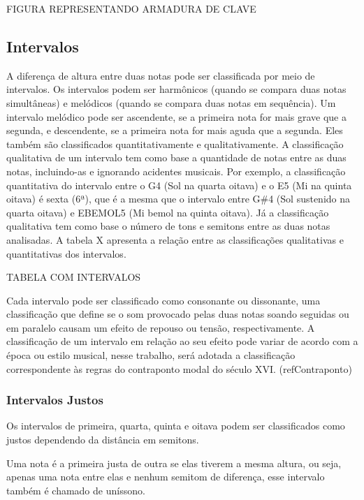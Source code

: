       FIGURA REPRESENTANDO ARMADURA DE CLAVE

    \subsection[Intervalos]{Intervalos}

      A diferença de altura entre duas notas pode ser classificada por meio de intervalos. Os intervalos podem ser harmônicos (quando se compara duas notas simultâneas) e melódicos (quando se compara duas notas em sequência). Um intervalo melódico pode ser ascendente, se a primeira nota for mais grave que a segunda, e descendente, se a primeira nota for mais aguda que a segunda. Eles também são classificados quantitativamente e qualitativamente. A classificação qualitativa de um intervalo tem como base a quantidade de notas entre as duas notas, incluindo-as e ignorando acidentes musicais. Por exemplo, a classificação quantitativa do intervalo entre o G4 (Sol na quarta oitava) e o E5 (Mi na quinta oitava) é sexta (6ª), que é a mesma que o intervalo entre G\#4 (Sol sustenido na quarta oitava) e EBEMOL5 (Mi bemol na quinta oitava). Já a classificação qualitativa tem como base o número de tons e semitons entre as duas notas analisadas. A tabela X apresenta a relação entre as classificações qualitativas e quantitativas dos intervalos.

      TABELA COM INTERVALOS

      Cada intervalo pode ser classificado como consonante ou dissonante, uma classificação que define se o som provocado pelas duas notas soando seguidas ou em paralelo causam um efeito de repouso ou tensão, respectivamente. A classificação de um intervalo em relação ao seu efeito pode variar de acordo com a época ou estilo musical, nesse trabalho, será adotada a classificação correspondente às regras do contraponto modal do século XVI. (refContraponto)

      \subsubsection[Intervalos Justos]{Intervalos Justos}

        Os intervalos de primeira, quarta, quinta e oitava podem ser classificados como justos dependendo da distância em semitons.

        Uma nota é a primeira justa de outra se elas tiverem a mesma altura, ou seja, apenas uma nota entre elas e nenhum semitom de diferença, esse intervalo também é chamado de uníssono.

